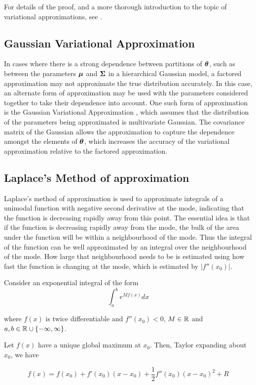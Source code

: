 \documentclass{amsart}[12pt]
\begin{document}
For details of the proof, and a more thorough introduction to the topic of variational approximations, see
\cite{Ormerod2010}.

\subsection{Gaussian Variational Approximation}

In cases where there is a strong dependence between partitions of ${\boldsymbol \theta}$,  such as between the parameters
${\boldsymbol \mu}$ and ${\boldsymbol \Sigma}$ in a hierarchical Gaussian model, a factored approximation may not approximate the true
distribution accurately. In this case, an alternate form of approximation may be used with the parameters
considered together to take their dependence into account. One such form of approximation is the Gaussian
Variational Approximation \cite{Ormerod2012}, which assumes that the distribution of the parameters being
approximated is multivariate Gaussian. The covariance matrix of the Gaussian allows the approximation to
capture the dependence amongst the elements of ${\boldsymbol \theta}$, which increases the accuracy of the variational
approximation relative to the factored approximation.

\subsection{Laplace's Method of approximation}

Laplace's method of approximation is used to approximate integrals of a unimodal function with negative second
derivative at the mode, indicating that the function is decreasing rapidly away from this point. The essential
idea is that if the function is decreasing rapidly away from the mode, the bulk of the area under the function
will be within a neighbourhood of the mode. Thus the integral of the function can be well approximated by an
integral over the neighbourhood of the mode. How large that neighbourhood needs to be is estimated using
how fast the function is changing at the mode, which is estimated by $|f''(x_0)|$.

Consider an exponential integral of the form
\[
	\int_a^b e^{M f(x)} dx
\]

where $f(x)$ is twice differentiable and $f''(x_0) < 0$, $M \in {\mathbb{R}}$ and $a, b \in {\mathbb{R}} \cup \{-\infty, \infty\}$.

Let $f(x)$ have a unique global maximum at $x_0$. Then, Taylor expanding about $x_0$, we have

\[
	f(x) = f(x_0) + f'(x_0) (x - x_0) + \frac{1}{2} f''(x_0) (x - x_0)^2 + R
\]
\end{document}
